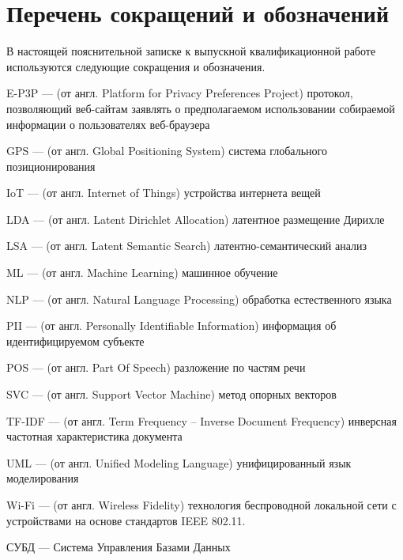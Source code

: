 \documentclass[../main]{subfiles}
\begin{document}
\newpage
{}
{}
\section*{Перечень сокращений и обозначений}

В настоящей пояснительной записке к выпускной квалификационной
работе используются следующие сокращения и обозначения.

\begin{termenum}
    \item E-P3P --- (от англ. Platform for Privacy Preferences Project) протокол, позволяющий веб-сайтам заявлять о предполагаемом использовании собираемой информации о пользователях веб-браузера
    \item GPS --- (от англ. Global Positioning System) система глобального позиционирования
    \item IoT --- (от англ. Internet of Things) устройства интернета вещей
    \item LDA --- (от англ. Latent Dirichlet Allocation) латентное размещение Дирихле
    \item LSA --- (от англ. Latent Semantic Search) латентно-семантический анализ
    \item ML --- (от англ. Machine Learning) машинное обучение
    \item NLP --- (от англ. Natural Language Processing) обработка естественного языка
    \item PII --- (от англ. Personally Identifiable Information) информация об идентифицируемом субъекте
    \item POS --- (от англ. Part Of Speech) разложение по частям речи
    \item SVC --- (от англ. Support Vector Machine) метод опорных векторов
    \item TF-IDF --- (от англ. Term Frequency -- Inverse Document Frequency) инверсная частотная характеристика документа
    \item UML --- (от англ. Unified Modeling Language) унифицированный язык моделирования
    \item Wi-Fi --- (от англ. Wireless Fidelity) технология беспроводной локальной сети с устройствами на основе стандартов IEEE 802.11.
    \item СУБД --- Система Управления Базами Данных
\end{termenum}
\end{document}

